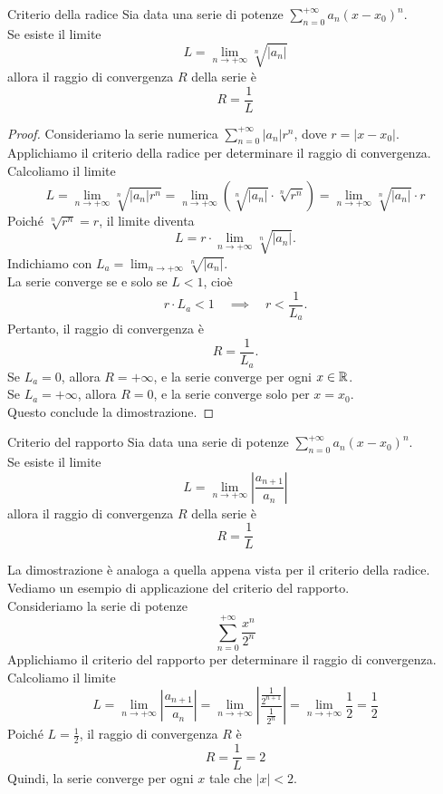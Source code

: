 \begin{teorema}{Criterio della radice}
  Sia data una serie di potenze $\sum_{n=0}^{+\infty} a_n (x-x_0)^n$.\\
  Se esiste il limite
  \[
      L = \lim_{n \to +\infty} \sqrt[n]{\lvert a_n \rvert}
  \]
  allora il raggio di convergenza $R$ della serie è
  \[
      R = \frac{1}{L}
  \]
\end{teorema}
\begin{proof}
  Consideriamo la serie numerica $\sum_{n=0}^{+\infty} \lvert a_n \rvert r^n$, dove $r = \lvert x - x_0 \rvert$.\\
  Applichiamo il criterio della radice per determinare il raggio di convergenza.\\
  Calcoliamo il limite
  \[
      L = \lim_{n \to +\infty} \sqrt[n]{\lvert a_n \rvert r^n} = \lim_{n \to +\infty} \left( \sqrt[n]{\lvert a_n \rvert} \cdot \sqrt[n]{r^n} \right) = \lim_{n \to +\infty} \sqrt[n]{\lvert a_n \rvert} \cdot r
  \]
  Poiché $\sqrt[n]{r^n} = r$, il limite diventa
  \[
      L = r \cdot \lim_{n \to +\infty} \sqrt[n]{\lvert a_n \rvert}.
  \]
  Indichiamo con $L_a = \lim_{n \to +\infty} \sqrt[n]{\lvert a_n \rvert}$.\\
  La serie converge se e solo se $L < 1$, cioè
  \[
      r \cdot L_a < 1 \quad \implies \quad r < \frac{1}{L_a}.
  \]
  Pertanto, il raggio di convergenza è
  \[
      R = \frac{1}{L_a}.
  \]
  Se $L_a = 0$, allora $R = +\infty$, e la serie converge per ogni $x \in \mathbb{R}$.\\
  Se $L_a = +\infty$, allora $R = 0$, e la serie converge solo per $x = x_0$.\\
  Questo conclude la dimostrazione.
\end{proof}
\begin{teorema}{Criterio del rapporto}
  Sia data una serie di potenze $\sum_{n=0}^{+\infty} a_n (x-x_0)^n$.\\
  Se esiste il limite
  \[
      L = \lim_{n \to +\infty} \left\lvert \frac{a_{n+1}}{a_n} \right\rvert
  \]
  allora il raggio di convergenza $R$ della serie è
  \[
      R = \frac{1}{L}
  \]
\end{teorema}
La dimostrazione è analoga a quella appena vista per il criterio della radice.\\
Vediamo un esempio di applicazione del criterio del rapporto.\\
  Consideriamo la serie di potenze
  \[
      \sum_{n=0}^{+\infty} \frac{x^n}{2^n}
  \]
  Applichiamo il criterio del rapporto per determinare il raggio di convergenza.\\
  Calcoliamo il limite
  \[
      L = \lim_{n \to +\infty} \left\lvert \frac{a_{n+1}}{a_n} \right\rvert = \lim_{n \to +\infty} \left\lvert \frac{\frac{1}{2^{n+1}}}{\frac{1}{2^n}} \right\rvert = \lim_{n \to +\infty} \frac{1}{2} = \frac{1}{2}
  \]
  Poiché $L = \frac{1}{2}$, il raggio di convergenza $R$ è
  \[
      R = \frac{1}{L} = 2
  \]
  Quindi, la serie converge per ogni $x$ tale che $\lvert x \rvert < 2$.

